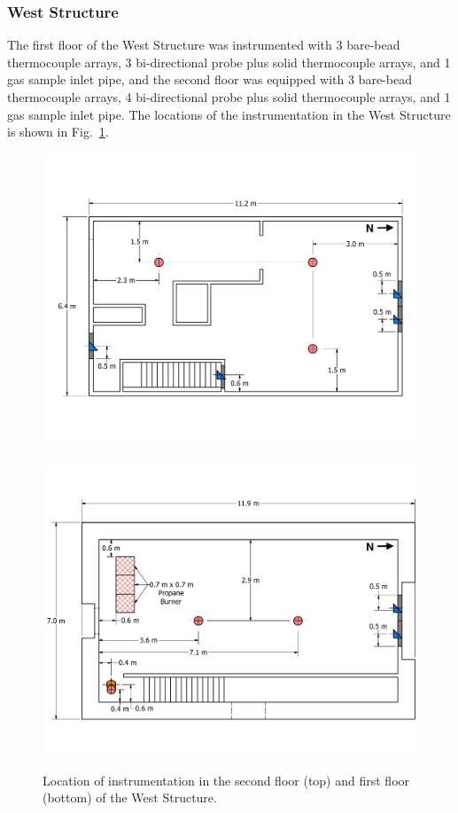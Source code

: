 \documentclass[12pt,oneside]{book}
\begin{document}
\subsubsection*{West Structure}
The first floor of the West Structure was instrumented with 3 bare-bead thermocouple arrays, 3 bi-directional probe plus solid thermocouple arrays, and 1 gas sample inlet pipe, and the second floor was equipped with 3 bare-bead thermocouple arrays, 4 bi-directional probe plus solid thermocouple arrays, and 1 gas sample inlet pipe. The locations of the instrumentation in the West Structure is shown in Fig.~\ref{fig:west_instrumentation}.

\begin{figure}[!ht]
	\includegraphics[width=\columnwidth]{../Figures/Floor_Plans/West_Structure_2nd_Floor_Dimensioned_Instrumentation}
	\\~\\
	\includegraphics[width=\columnwidth]{../Figures/Floor_Plans/West_Structure_1st_Floor_Dimensioned_Instrumentation}
	\caption[Location of instrumentation in the West Structure.]{Location of instrumentation in the second floor (top) and first floor (bottom) of the West Structure.}
	\label{fig:west_instrumentation}
\end{figure}
\end{document}
